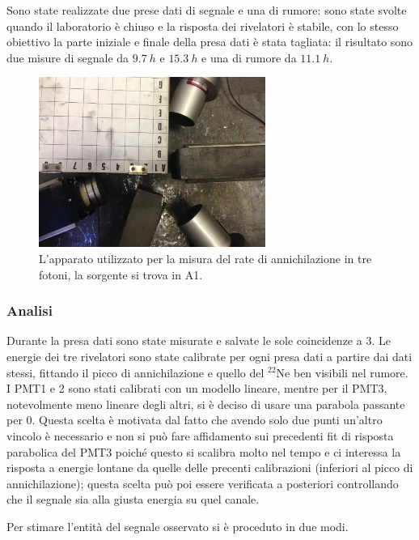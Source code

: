 Sono state realizzate due prese dati di segnale e una di rumore: sono state svolte quando il laboratorio è chiuso e la risposta dei rivelatori è stabile, con lo stesso obiettivo la parte iniziale e finale della presa dati è stata tagliata: il risultato sono due misure di segnale da $\SI{9.7}{h}$ e $\SI{15.3}{h}$ e una di rumore da $\SI{11.1}{h}$.
 \begin{figure}[h]
	\centering
	\includegraphics[width=20em]{immagini/3gamma_foto}
	\caption{\label{fig:3gamma_signal} L'apparato utilizzato per la misura del rate di annichilazione in tre fotoni, la sorgente si trova in A1.}
	\label{fig:foto_3gamma}
\end{figure}
\subsubsection{Analisi}
Durante la presa dati sono state misurate e salvate le sole coincidenze a 3. Le energie dei tre rivelatori sono state calibrate per ogni presa dati a partire dai dati stessi, fittando il picco di annichilazione e quello del $^22\text{Ne}$ ben visibili nel rumore. I PMT1 e 2 sono stati calibrati con un modello lineare, mentre per il PMT3, notevolmente meno lineare degli altri, si è deciso di usare una parabola passante per 0. Questa scelta è motivata dal fatto che avendo solo due punti un'altro vincolo è necessario e non si può fare affidamento sui precedenti fit di risposta parabolica del PMT3 poiché questo si scalibra molto nel tempo e ci interessa la risposta a energie lontane da quelle delle precenti calibrazioni (inferiori al picco di annichilazione); questa scelta può poi essere verificata a posteriori controllando che il segnale sia alla giusta energia su quel canale.

Per stimare l'entità del segnale osservato si è proceduto in due modi.
